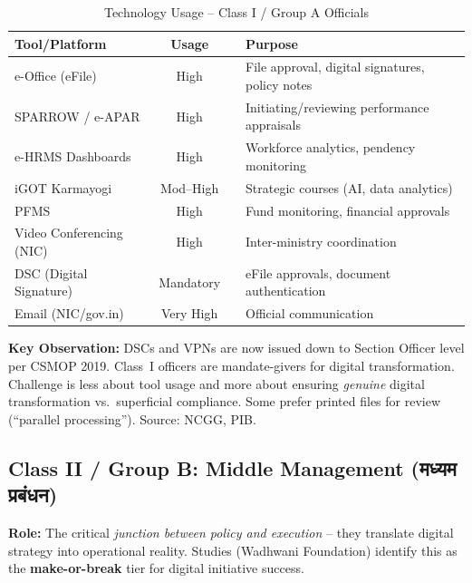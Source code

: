 \documentclass[12pt,a4paper]{article}
\newcommand{\hindi}[1]{{\hindifont #1}}
\begin{document}
\begin{table}[H]
\centering
\caption{Technology Usage  --  Class I / Group A Officials}
\label{tab:class1}
\begin{tabularx}{\textwidth}{@{}lcp{1cm}X@{}}
\toprule
\textbf{Tool/Platform} & \textbf{Usage} & & \textbf{Purpose} \\
\midrule
e-Office (eFile) & High & & File approval, digital signatures, policy notes \\
SPARROW / e-APAR & High & & Initiating/reviewing performance appraisals \\
e-HRMS Dashboards & High & & Workforce analytics, pendency monitoring \\
iGOT Karmayogi & Mod--High & & Strategic courses (AI, data analytics) \\
PFMS & High & & Fund monitoring, financial approvals \\
Video Conferencing (NIC) & High & & Inter-ministry coordination \\
DSC (Digital Signature) & Mandatory & & eFile approvals, document authentication \\
Email (NIC/gov.in) & Very High & & Official communication \\
\bottomrule
\end{tabularx}
\end{table}

\textbf{Key Observation:} DSCs and VPNs are now issued down to Section Officer level per CSMOP 2019. Class~I officers are mandate-givers for digital transformation. Challenge is less about tool usage and more about ensuring \textit{genuine} digital transformation vs.\ superficial compliance. Some prefer printed files for review (``parallel processing''). Source: NCGG, PIB.

\subsection{Class II / Group B: Middle Management (\hindi{मध्यम प्रबंधन})}

\textbf{Role:} The critical \textit{junction between policy and execution} -- they translate digital strategy into operational reality. Studies (Wadhwani Foundation) identify this as the \textbf{make-or-break} tier for digital initiative success.
\end{document}
